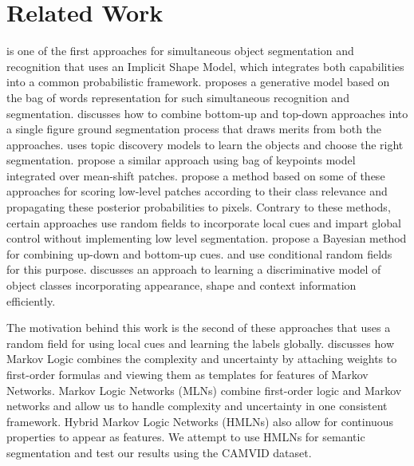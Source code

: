\documentclass{article} %
\begin{document}

\section{Related Work}
\label{sec:Related}

\cite{Leibe04combinedobject} is one of the first approaches for simultaneous object segmentation and recognition that uses an Implicit Shape Model, which integrates both capabilities into a common probabilistic framework. \cite{cao:spatially} proposes a generative model based on the bag of words representation for such simultaneous recognition and segmentation. \cite{Borenstein04combiningtop} discusses how to combine bottom-up and top-down approaches into a single figure ground segmentation process that draws merits from both the approaches. \cite{Russell:2006:UMS:1153171.1153637} uses topic discovery models to learn the objects and choose the right segmentation. \cite{lin07multiple} propose a similar approach using bag of keypoints model integrated over mean-shift patches. \cite{conf/bmvc/CsurkaP08} propose a method based on some of these approaches for scoring low-level patches according to their class relevance and propagating these posterior probabilities to pixels. Contrary to these methods, certain approaches use random fields to incorporate local cues and impart global control without implementing low level segmentation. \cite{Kumar:2005:OC:1068507.1068889} propose a Bayesian method for combining up-down and bottom-up cues. \cite{Richard04multiscaleconditional} and \cite{Kumar:2005:HFF:1097115.1097790} use conditional random fields for this purpose. \cite{Shotton06textonboost:joint} discusses an approach to learning a discriminative model of object classes incorporating appearance, shape and context information efficiently. 

The motivation behind this work is the second of these approaches that uses a random field for using local cues and learning the labels globally. \cite{Domingos06unifyinglogical} discusses how Markov Logic combines the complexity and uncertainty by attaching weights to first-order formulas and viewing them as templates for features of Markov Networks. Markov Logic Networks (MLNs) \cite{Richardson06markovlogic} combine first-order logic and Markov networks and allow us to handle complexity and uncertainty in one consistent framework. Hybrid Markov Logic Networks (HMLNs)\cite{Wang_hybridmarkov} also allow for continuous properties to appear as features. We attempt to use HMLNs for semantic segmentation and test our results using the CAMVID dataset. 
\end{document}
